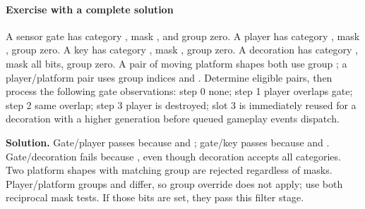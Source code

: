 \begin{allmightroleexercise}

\paragraph{Exercise with a complete
solution}\label{exercise-with-a-complete-solution}

\hypertarget{exercise-with-a-complete-solution}{}

A sensor gate has category , mask
, and group zero. A
player has category , mask
, group zero. A key has category
, mask , group zero.
A decoration has category , mask all bits,
group zero. A pair of moving platform shapes both use group
; a player/platform pair uses group indices
 and . Determine eligible pairs,
then process the following gate observations: step 0 none; step 1 player
overlaps gate; step 2 same overlap; step 3 player is destroyed; slot 3
is immediately reused for a decoration with a higher generation before
queued gameplay events dispatch.

\end{allmightroleexercise}

\textbf{Solution.} Gate/player passes because
 and
; gate/key passes because
 and
. Gate/decoration fails
because , even though
decoration accepts all categories. Two platform shapes with matching
group  are rejected regardless of masks.
Player/platform groups  and 
differ, so group override does not apply; use both reciprocal mask
tests. If those bits are set, they pass this filter stage.
